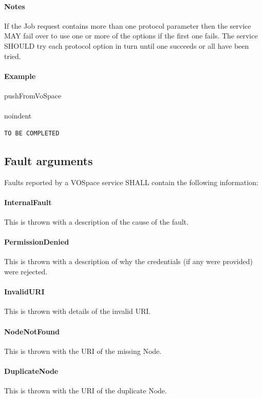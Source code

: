 \documentclass[11pt,a4paper]{ivoa}
\begin{document}
\paragraph{Notes}
If the Job request contains more than one protocol parameter then the service MAY fail over to use one or more of the options if the first one fails. The service SHOULD try each protocol option in turn until one succeeds or all have been tried.

\paragraph{Example}
pushFromVoSpace
\\[5px]
\\noindent
\begin{lstlisting}
TO BE COMPLETED
\end{lstlisting}

\subsection{Fault arguments}
\label{subsec:fault arguments}
Faults reported by a VOSpace service SHALL contain the following information:

\paragraph{InternalFault}
This is thrown with a description of the cause of the fault.

\paragraph{PermissionDenied}
This is thrown with a description of why the credentials (if any were provided) were rejected.

\paragraph{InvalidURI}
This is thrown with details of the invalid URI.

\paragraph{NodeNotFound}
This is thrown with the URI of the missing Node.

\paragraph{DuplicateNode}
This is thrown with the URI of the duplicate Node.
\end{document}
